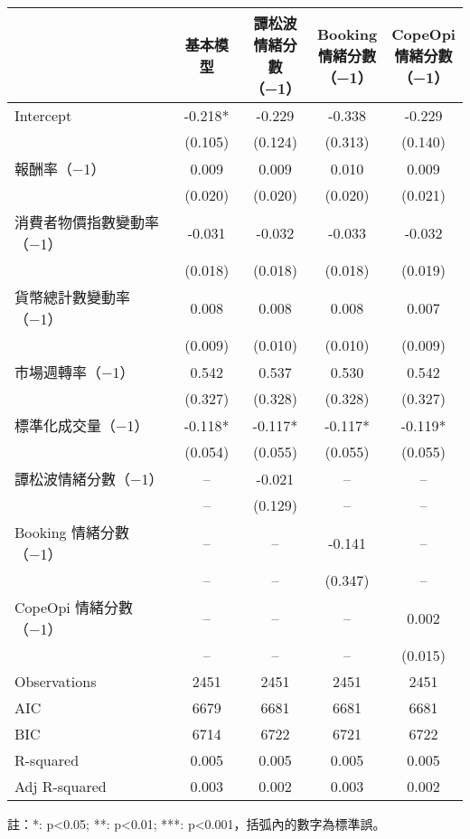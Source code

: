 \documentclass{article}
\begin{document}
    \fontsize{12pt}{14pt}\selectfont
    
    \begin{tabular}{lcccc}
\toprule
 & 基本模型 & \makecell{譚松波\\情緒分數\\（−1）} & \makecell{Booking\\情緒分數\\（−1）} & \makecell{CopeOpi\\情緒分數\\（−1）} \\
\midrule
Intercept & -0.218* & -0.229 & -0.338 & -0.229 \\
 & (0.105) & (0.124) & (0.313) & (0.140) \\
報酬率（−1） & 0.009 & 0.009 & 0.010 & 0.009 \\
 & (0.020) & (0.020) & (0.020) & (0.021) \\
消費者物價指數變動率（−1） & -0.031 & -0.032 & -0.033 & -0.032 \\
 & (0.018) & (0.018) & (0.018) & (0.019) \\
貨幣總計數變動率（−1） & 0.008 & 0.008 & 0.008 & 0.007 \\
 & (0.009) & (0.010) & (0.010) & (0.009) \\
市場週轉率（−1） & 0.542 & 0.537 & 0.530 & 0.542 \\
 & (0.327) & (0.328) & (0.328) & (0.327) \\
標準化成交量（−1） & -0.118* & -0.117* & -0.117* & -0.119* \\
 & (0.054) & (0.055) & (0.055) & (0.055) \\
譚松波情緒分數（−1） & -- & -0.021 & -- & -- \\
 & -- & (0.129) & -- & -- \\
Booking 情緒分數（−1） & -- & -- & -0.141 & -- \\
 & -- & -- & (0.347) & -- \\
CopeOpi 情緒分數（−1） & -- & -- & -- & 0.002 \\
 & -- & -- & -- & (0.015) \\
\midrule
Observations &   2451 &   2451 &   2451 &   2451 \\
AIC &    6679 &    6681 &    6681 &    6681 \\
BIC &    6714 &    6722 &    6721 &    6722 \\
R-squared &    0.005 &    0.005 &    0.005 &    0.005 \\
Adj R-squared &    0.003 &    0.002 &    0.003 &    0.002 \\
\bottomrule
\end{tabular}

    
    \fontsize{11pt}{14pt}\selectfont
    註：*: p<0.05; **: p<0.01; ***: p<0.001，括弧內的數字為標準誤。
    
\end{document}

